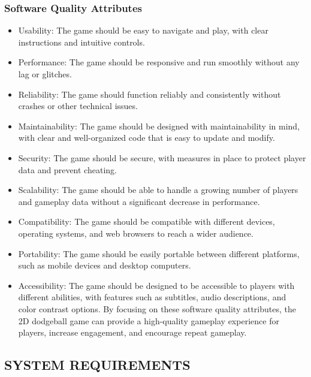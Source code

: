 \documentclass[12pt]{report}
\begin{document}
\subsubsection{  Software Quality Attributes}

\normalsize
\begin{itemize}
    \item Usability: The game should be easy to navigate and play, with clear instructions and intuitive controls.
    \item Performance: The game should be responsive and run smoothly without any lag or glitches.
    \item Reliability: The game should function reliably and consistently without crashes or other technical issues.
    \item Maintainability: The game should be designed with maintainability in mind, with clear and well-organized code that is easy to update and modify.
    \item Security: The game should be secure, with measures in place to protect player data and prevent cheating.
    \item Scalability: The game should be able to handle a growing number of players and gameplay data without a significant decrease in performance.
    \item Compatibility: The game should be compatible with different devices, operating systems, and web browsers to reach a wider audience.
    \item Portability: The game should be easily portable between different platforms, such as mobile devices and desktop computers.
    \item Accessibility: The game should be designed to be accessible to players with different abilities, with features such as subtitles, audio descriptions, and color contrast options.
    By focusing on these software quality attributes, the 2D dodgeball game can provide a high-quality gameplay experience for players, increase engagement, and encourage repeat gameplay.
    
\end{itemize}

\centering
\raggedright
\subsection{ SYSTEM REQUIREMENTS}

\justifying
\setlength{\parindent}{4em}
\setlength{\parskip}{0.5em}
\renewcommand{\baselinestretch}{1.5}
\end{document}

